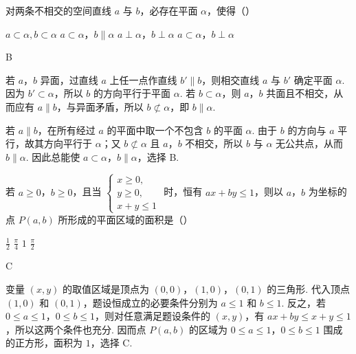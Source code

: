 \begin{problem}
对两条不相交的空间直线 \(a\) 与 \(b\)，必存在平面 \(\alpha\)，使得（\quad）

\choices
    {\(a \subset \alpha, b \subset \alpha\)}
    {\(a \subset \alpha\)，\(b \parallel \alpha\)}
    {\(a \perp \alpha\)，\(b \perp \alpha\)}
    {\(a \subset \alpha\)，\(b \perp \alpha\)}
\end{problem}

\begin{answer}
B
\end{answer}

\begin{solution}
若 \(a\)，\(b\) 异面，过直线 \(a\) 上任一点作直线 \(b'\parallel b\)，则相交直线 \(a\) 与 \(b'\) 确定平面 \(\alpha\). 因为 \(b'\subset\alpha\)，所以 \(b\) 的方向平行于平面 \(\alpha\). 若 \(b\subset\alpha\)，则 \(a\)，\(b\) 共面且不相交，从而应有 \(a\parallel b\)，与异面矛盾，所以 \(b\not\subset\alpha\)，即 \(b\parallel\alpha\).

若 \(a\parallel b\)，在所有经过 \(a\) 的平面中取一个不包含 \(b\) 的平面 \(\alpha\). 由于 \(b\) 的方向与 \(a\) 平行，故其方向平行于 \(\alpha\)；又 \(b\not\subset\alpha\) 且 \(a\)，\(b\) 不相交，所以 \(b\) 与 \(\alpha\) 无公共点，从而 \(b\parallel\alpha\). 因此总能使 \(a\subset\alpha\)，\(b\parallel\alpha\)，选择 B.
\end{solution}

\begin{problem}
若 \(a \geqslant 0\)，\(b \geqslant 0\)，且当 \(\begin{cases}
x \geqslant 0,\\
y \geqslant 0,\\
x + y \leqslant 1
\end{cases}\) 时，恒有 \(ax + by \leqslant 1\)，则以 \(a\)，\(b\) 为坐标的点 \(P(a, b)\) 所形成的平面区域的面积是（\quad）

\choices
    {\( \frac{1}{2} \)}
    {\( \frac{\pi}{4} \)}
    {\(1\)}
    {\(\frac{\pi}{2}\)}
\end{problem}

\begin{answer}
C
\end{answer}

\begin{solution}
变量 \((x,y)\) 的取值区域是顶点为 \((0,0)\)，\((1,0)\)，\((0,1)\) 的三角形. 代入顶点 \((1,0)\) 和 \((0,1)\)，题设恒成立的必要条件分别为 \(a\leqslant1\) 和 \(b\leqslant1\). 反之，若 \(0\leqslant a\leqslant1\)，\(0\leqslant b\leqslant1\)，则对任意满足题设条件的 \((x,y)\)，有 \(ax+by\leqslant x+y\leqslant1\)，所以这两个条件也充分. 因而点 \(P(a,b)\) 的区域为 \(0\leqslant a\leqslant1\)，\(0\leqslant b\leqslant1\) 围成的正方形，面积为 \(1\)，选择 C.
\end{solution}

